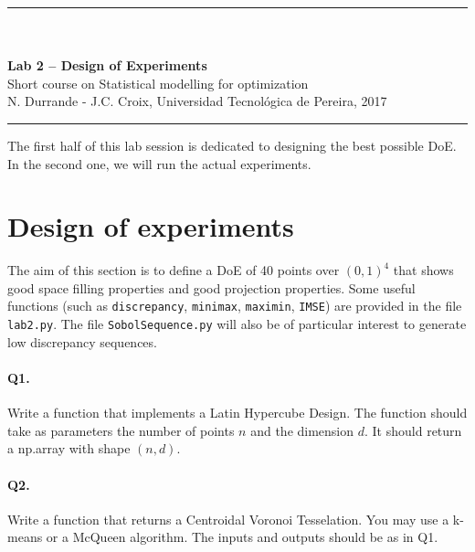 \documentclass[12pt]{scrartcl}
\begin{document}
\begin{center}
	\rule{\textwidth}{1pt}
	\\ \ \\
	{\LARGE \textbf{Lab 2 -- Design of Experiments}}\\ 
	\vspace{3mm}
	{\large Short course on Statistical modelling for optimization\\ \vspace{3mm}}
	{\normalsize N. Durrande - J.C. Croix, Universidad Tecnol\'ogica de Pereira, 2017}\\ 
	\vspace{3mm}
	\rule{\textwidth}{1pt}
	\vspace{5mm}
\end{center}
The first half of this lab session is dedicated to designing the best possible DoE. In the second one, we will run the actual experiments. 

\section{Design of experiments}
The aim of this section is to define a DoE of 40 points over $(0,1)^4$ that shows good space filling properties and good projection properties. Some useful functions (such as \texttt{discrepancy}, \texttt{minimax}, \texttt{maximin}, \texttt{IMSE}) are provided in the file \texttt{lab2.py}. The file \texttt{SobolSequence.py} will also be of particular interest to generate low discrepancy sequences. 

\paragraph{Q1.} Write a function that implements a Latin Hypercube Design. The function should take as parameters the number of points $n$ and the dimension $d$. It should return a np.array with shape $(n,d)$.

\paragraph{Q2.} Write a function that returns a Centroidal Voronoi Tesselation. You may use a k-means or a McQueen algorithm. The inputs and outputs should be as in Q1.
\end{document}
